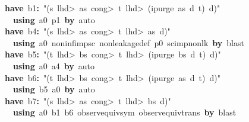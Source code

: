 \documentclass{article}
\newcommand{\syntaxKEYWORDA}[1]{\textcolor[rgb]{0.0,0.4,0.6}{\textbf{#1}}}
\newcommand{\syntaxLITERALA}[1]{\textcolor[rgb]{1.0,0.0,0.8}{#1}}
\newcommand{\syntaxOPERATOR}[1]{\textcolor[rgb]{0.0,0.0,0.0}{\textbf{#1}}}
\newcommand{\syntaxKEYWORDA}[1]{\textcolor[rgb]{0.0,0.4,0.6}{\textbf{#1}}}
\newcommand{\syntaxLITERALA}[1]{\textcolor[rgb]{1.0,0.0,0.8}{#1}}
\newcommand{\syntaxOPERATOR}[1]{\textcolor[rgb]{0.0,0.0,0.0}{\textbf{#1}}}
\newcommand{\syntaxKEYWORDA}[1]{\textcolor[rgb]{0.0,0.4,0.6}{\textbf{#1}}}
\newcommand{\syntaxLITERALA}[1]{\textcolor[rgb]{1.0,0.0,0.8}{#1}}
\newcommand{\syntaxOPERATOR}[1]{\textcolor[rgb]{0.0,0.0,0.0}{\textbf{#1}}}
\newcommand{\syntaxKEYWORDA}[1]{\textcolor[rgb]{0.0,0.4,0.6}{#1}}
\newcommand{\syntaxLITERALA}[1]{\textcolor[rgb]{1.0,0.0,0.8}{\textbf{#1}}}
\newcommand{\syntaxOPERATOR}[1]{\textcolor[rgb]{0.0,0.0,0.0}{#1}}
\newcommand{\syntaxKEYWORDA}[1]{\textcolor[rgb]{0.0,0.4,0.6}{\textbf{#1}}}
\newcommand{\syntaxLITERALA}[1]{\textcolor[rgb]{1.0,0.0,0.8}{#1}}
\newcommand{\syntaxOPERATOR}[1]{\textcolor[rgb]{0.0,0.0,0.0}{\textbf{#1}}}
\newcommand{\syntaxKEYWORDA}[1]{\textcolor[rgb]{0.0,0.4,0.6}{\textbf{#1}}}
\newcommand{\syntaxLITERALA}[1]{\textcolor[rgb]{1.0,0.0,0.8}{#1}}
\newcommand{\syntaxOPERATOR}[1]{\textcolor[rgb]{0.0,0.0,0.0}{\textbf{#1}}}
\begin{document}
{\ }{\ }{\ }{\ }{\ }{\ }{\ }{\ }{\ }\syntaxKEYWORDA{have}{\ }b1\syntaxOPERATOR{:}{\ }\syntaxLITERALA{"(s{\ }\<lhd>{\ }as{\ }\<cong>{\ }t{\ }\<lhd>{\ }(ipurge{\ }as{\ }d{\ }t){\ }\usebox{\atbox}{\ }d)"}\hspace*{\fill}\\
{\ }{\ }{\ }{\ }{\ }{\ }{\ }{\ }{\ }{\ }{\ }\syntaxKEYWORDA{using}{\ }a0{\ }p1{\ }\syntaxKEYWORDA{by}{\ }auto\hspace*{\fill}\\
{\ }{\ }{\ }{\ }{\ }{\ }{\ }{\ }{\ }\syntaxKEYWORDA{have}{\ }b4\syntaxOPERATOR{:}{\ }\syntaxLITERALA{"(s{\ }\<lhd>{\ }as{\ }\<cong>{\ }t{\ }\<lhd>{\ }as{\ }\usebox{\atbox}{\ }d)"}\hspace*{\fill}\\
{\ }{\ }{\ }{\ }{\ }{\ }{\ }{\ }{\ }{\ }{\ }\syntaxKEYWORDA{using}{\ }a0{\ }noninf\usebox{\underscorebox}imp\usebox{\underscorebox}sc{\ }nonleakage\usebox{\underscorebox}def{\ }p0{\ }sc\usebox{\underscorebox}imp\usebox{\underscorebox}nonlk{\ }\syntaxKEYWORDA{by}{\ }blast\hspace*{\fill}\\
{\ }{\ }{\ }{\ }{\ }{\ }{\ }{\ }{\ }\syntaxKEYWORDA{have}{\ }b5\syntaxOPERATOR{:}{\ }\syntaxLITERALA{"(t{\ }\<lhd>{\ }bs{\ }\<cong>{\ }t{\ }\<lhd>{\ }(ipurge{\ }bs{\ }d{\ }t){\ }\usebox{\atbox}{\ }d)"}\hspace*{\fill}\\
{\ }{\ }{\ }{\ }{\ }{\ }{\ }{\ }{\ }{\ }{\ }\syntaxKEYWORDA{using}{\ }a0{\ }a4{\ }\syntaxKEYWORDA{by}{\ }auto\hspace*{\fill}\\
{\ }{\ }{\ }{\ }{\ }{\ }{\ }{\ }{\ }\syntaxKEYWORDA{have}{\ }b6\syntaxOPERATOR{:}{\ }\syntaxLITERALA{"(t{\ }\<lhd>{\ }bs{\ }\<cong>{\ }t{\ }\<lhd>{\ }(ipurge{\ }as{\ }d{\ }t){\ }\usebox{\atbox}{\ }d)"}\hspace*{\fill}\\
{\ }{\ }{\ }{\ }{\ }{\ }{\ }{\ }{\ }{\ }{\ }\syntaxKEYWORDA{using}{\ }b5{\ }a0{\ }\syntaxKEYWORDA{by}{\ }auto\hspace*{\fill}\\
{\ }{\ }{\ }{\ }{\ }{\ }{\ }{\ }{\ }\syntaxKEYWORDA{have}{\ }b7\syntaxOPERATOR{:}{\ }\syntaxLITERALA{"(s{\ }\<lhd>{\ }as{\ }\<cong>{\ }t{\ }\<lhd>{\ }bs{\ }\usebox{\atbox}{\ }d)"}\hspace*{\fill}\\
{\ }{\ }{\ }{\ }{\ }{\ }{\ }{\ }{\ }{\ }{\ }\syntaxKEYWORDA{using}{\ }a0{\ }b1{\ }b6{\ }observ\usebox{\underscorebox}equiv\usebox{\underscorebox}sym{\ }observ\usebox{\underscorebox}equiv\usebox{\underscorebox}trans{\ }\syntaxKEYWORDA{by}{\ }blast\hspace*{\fill}\\
\end{document}
